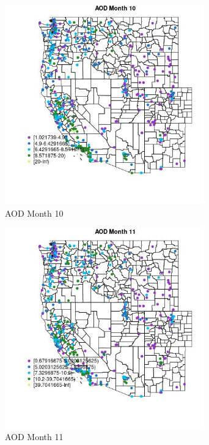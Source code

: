\begin{figure} 
\centering  
\includegraphics[width=0.77\textwidth]{Code_Outputs/ML_input_report_ML_input_PM25_Step5_part_d_de_duplicated_aves_ML_input_MapObsMo10AOD.jpg} 
\caption{\label{fig:ML_input_report_ML_input_PM25_Step5_part_d_de_duplicated_aves_ML_inputMapObsMo10AOD}AOD Month 10} 
\end{figure} 
 

\begin{figure} 
\centering  
\includegraphics[width=0.77\textwidth]{Code_Outputs/ML_input_report_ML_input_PM25_Step5_part_d_de_duplicated_aves_ML_input_MapObsMo11AOD.jpg} 
\caption{\label{fig:ML_input_report_ML_input_PM25_Step5_part_d_de_duplicated_aves_ML_inputMapObsMo11AOD}AOD Month 11} 
\end{figure} 
 

